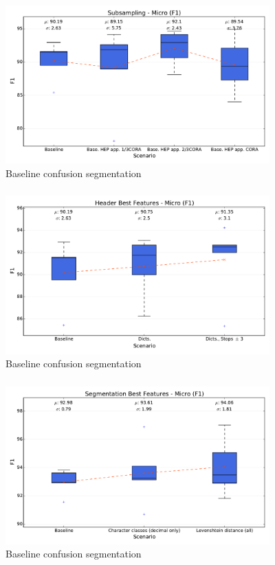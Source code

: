 \documentclass{beamer}
\begin{document}

\begin{frame}
\frametitle{}
\begin{figure}[h]
\center
\includegraphics[width=4in]{Figures/micro_subsampling.pdf}
\caption{Baseline confusion segmentation}
\end{figure}
\end{frame}


\begin{frame}
\frametitle{}
\begin{figure}[h]
\center
\includegraphics[width=4in]{Figures/micro_header.pdf}
\caption{Baseline confusion segmentation}
\end{figure}
\end{frame}


\begin{frame}
\frametitle{}
\begin{figure}[h]
\center
\includegraphics[width=4in]{Figures/micro_segmentation.pdf}
\caption{Baseline confusion segmentation}
\end{figure}
\end{frame}
\end{document}

